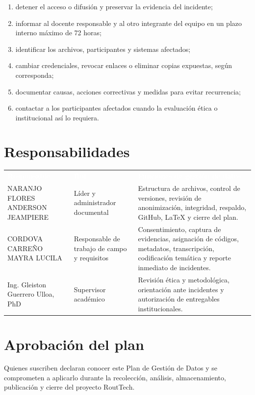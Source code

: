 \documentclass[10pt,a4paper]{article}
\newcommand{\Docente}{Ing. Gleiston Guerrero Ulloa, PhD}
\newcommand{\Anderson}{NARANJO FLORES ANDERSON JEAMPIERE}
\newcommand{\Mayra}{CORDOVA CARREÑO MAYRA LUCILA}
\begin{document}
\begin{enumerate}
  \item detener el acceso o difusión y preservar la evidencia del incidente;
  \item informar al docente responsable y al otro integrante del equipo en un plazo interno máximo de 72 horas;
  \item identificar los archivos, participantes y sistemas afectados;
  \item cambiar credenciales, revocar enlaces o eliminar copias expuestas, según corresponda;
  \item documentar causas, acciones correctivas y medidas para evitar recurrencia;
  \item contactar a los participantes afectados cuando la evaluación ética o institucional así lo requiera.
\end{enumerate}

\section{Responsabilidades}

\small
{}
\noindent\begin{tabularx}{\textwidth}{@{}L{3.9cm} L{3.45cm} J@{}}
\textcolor{white}{\textbf{Responsable}} &
\textcolor{white}{\textbf{Rol}} &
\textcolor{white}{\textbf{Funciones de gestión de datos}}\\
\Anderson & Líder y administrador documental & Estructura de archivos, control de versiones, revisión de anonimización, integridad, respaldo, GitHub, LaTeX y cierre del plan.\\
\Mayra & Responsable de trabajo de campo y requisitos & Consentimiento, captura de evidencias, asignación de códigos, metadatos, transcripción, codificación temática y reporte inmediato de incidentes.\\
\Docente & Supervisor académico & Revisión ética y metodológica, orientación ante incidentes y autorización de entregables institucionales.\\
\end{tabularx}
\normalsize

\section{Aprobación del plan}

\begin{InfoBox}[Declaración]
Quienes suscriben declaran conocer este Plan de Gestión de Datos y se comprometen a aplicarlo durante la recolección, análisis, almacenamiento, publicación y cierre del proyecto RoutTech.
\end{InfoBox}
\end{document}
